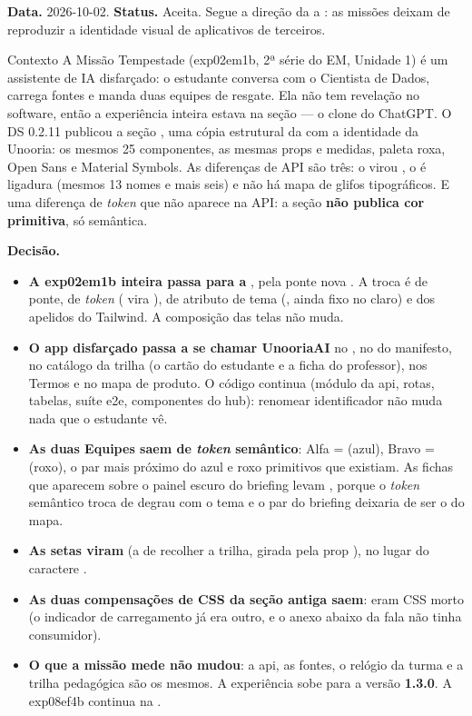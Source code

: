 \textbf{Data.} 2026-10-02. \textbf{Status.} Aceita. Segue a direção da
 a : as missões deixam de reproduzir a identidade
visual de aplicativos de terceiros.

\begin{especificacao}{Contexto}
A Missão Tempestade (exp02em1b, 2ª série do EM, Unidade 1) é um assistente de
IA disfarçado: o estudante conversa com o Cientista de Dados, carrega fontes e
manda duas equipes de resgate. Ela não tem revelação no software, então a
experiência inteira estava na seção  --- o clone do ChatGPT. O DS
0.2.11 publicou a seção , uma cópia estrutural da 
com a identidade da Unooria: os mesmos 25 componentes, as mesmas props e
medidas, paleta roxa, Open Sans e Material Symbols. As diferenças de API são
três: o  virou , o  é ligadura (mesmos
13 nomes e mais seis) e não há mapa de glifos tipográficos. E uma diferença de
\emph{token} que não aparece na API: a seção \textbf{não publica cor primitiva},
só semântica.
\end{especificacao}

\textbf{Decisão.}

\begin{itemize}
  \item \textbf{A exp02em1b inteira passa para a }, pela ponte
    nova . A troca é de ponte, de \emph{token}
    ( vira ), de atributo de tema
    (, ainda fixo no claro) e dos apelidos do Tailwind. A
    composição das telas não muda.
  \item \textbf{O app disfarçado passa a se chamar UnooriaAI} no
    , no  do manifesto, no catálogo da trilha (o cartão do
    estudante e a ficha do professor), nos Termos e no mapa de produto. O código
    continua
     (módulo da api, rotas, tabelas, suíte e2e, componentes do
    hub): renomear identificador não muda nada que o estudante vê.
  \item \textbf{As duas Equipes saem de \emph{token} semântico}: Alfa =
     (azul), Bravo =  (roxo), o par
    mais próximo do azul e roxo primitivos que existiam. As fichas que aparecem
    sobre o painel escuro do briefing levam , porque
    o \emph{token} semântico troca de degrau com o tema e o par do briefing
    deixaria de ser o do mapa.
  \item \textbf{As setas viram } (a de recolher
    a trilha, girada pela prop ), no lugar do caractere .
  \item \textbf{As duas compensações de CSS da seção antiga saem}: eram CSS
    morto (o indicador de carregamento já era outro, e o anexo abaixo da fala
    não tinha consumidor).
  \item \textbf{O que a missão mede não mudou}: a api, as fontes, o relógio da
    turma e a trilha pedagógica são os mesmos. A experiência sobe para a versão
    \textbf{1.3.0}. A exp08ef4b continua na .
\end{itemize}

